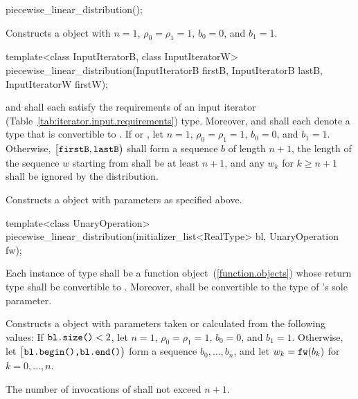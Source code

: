 \begin{itemdecl}
piecewise_linear_distribution();
\end{itemdecl}

\begin{itemdescr}
\pnum\effects Constructs a  object
 with $ n = 1 $,
 $\rho_0 = \rho_1 = 1 $,
 $ b_0 = 0 $,
 and $ b_1 = 1 $.
\end{itemdescr}

\begin{itemdecl}
template<class InputIteratorB, class InputIteratorW>
 piecewise_linear_distribution(InputIteratorB firstB, InputIteratorB lastB,
                               InputIteratorW firstW);
\end{itemdecl}

\begin{itemdescr}
\pnum\requires
   and 
  shall each satisfy the requirements
  of an input iterator (Table~\ref{tab:iterator.input.requirements}) type.
  Moreover,
   and
  shall each denote a type that is convertible to .
 If 
 or ,
 let $ n = 1 $,
     $ \rho_0 = \rho_1 = 1 $,
     $ b_0 = 0 $,
 and $ b_1 = 1 $.
 Otherwise,
 $\bigl[\texttt{firstB}, \texttt{lastB}\bigr)$
 shall form a sequence $b$ of length $n+1$,
 the length of the sequence $w$ starting from 
 shall be at least $n+1$,
 and any $w_k$ for  $k \geq n+1$ shall be ignored by the distribution.

\pnum\effects Constructs a  object
 with parameters as specified above.
\end{itemdescr}


%
\begin{itemdecl}
template<class UnaryOperation>
 piecewise_linear_distribution(initializer_list<RealType> bl, UnaryOperation fw);
\end{itemdecl}

\begin{itemdescr}
\pnum\requires
 Each instance of type 
 shall be a function object~(\ref{function.objects})
 whose return type shall be convertible to .
 Moreover,
  shall be convertible
 to the type of 's sole parameter.

\pnum\effects Constructs a  object
 with parameters taken or calculated
 from the following values:
 If $\texttt{bl.size()} < 2$,
 let $n = 1$,
     $ \rho_0 = \rho_1 = 1 $,
     $ b_0 = 0 $,
 and $ b_1 = 1 $.
 Otherwise,
 let $\bigl[\texttt{bl.begin(),} \texttt{bl.end()}\bigr)$
 form a sequence $ b_0, \ldots, b_n $,
 and
 let $ w_k = \texttt{fw}(b_k) $
 for $ k = 0, \ldots, n $.

\pnum\complexity
 The number of invocations of  shall not exceed $n+1$.
\end{itemdescr}


